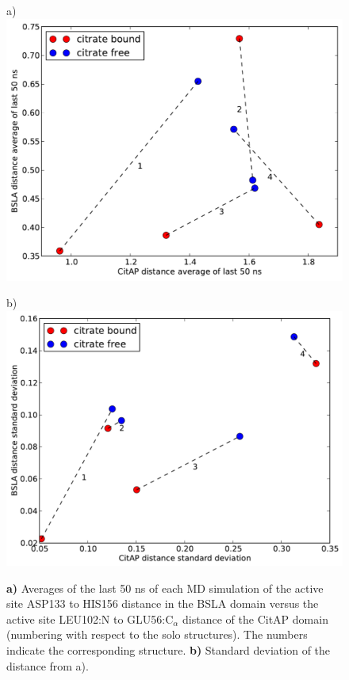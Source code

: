 \documentclass[english, a4paper, 12pt, titlepage, draft]{article}
\begin{document}
\begin{figure}
    \begin{minipage}[]{0.45\linewidth}
        \centering
        a)
        \includegraphics[width=\textwidth]{figures/CitAP_BSLA_distance/BSLA_CitAP_analyzed_with_average_of_last_50_ns.pdf}  
    \end{minipage}
\hspace{0.5cm}
    \begin{minipage}[]{0.45\linewidth}
        \centering
        b)
        \includegraphics[width=\textwidth]{figures/CitAP_BSLA_distance/BSLA_CitAP_analyzed_with_standard_deviation.pdf}  
    \end{minipage}
    \caption{\textbf{a)} Averages of the last 50 ns of each MD simulation of the active site ASP133 to HIS156 distance in the BSLA domain versus the active site LEU102:N to GLU56:C$_{\alpha}$ distance of the CitAP domain (numbering with respect to the solo structures).
        The numbers indicate the corresponding structure.
        \textbf{b)} Standard deviation of the distance from a).}
\label{fig:active_site_mean_sd}
\end{figure}     
 
\end{document}
